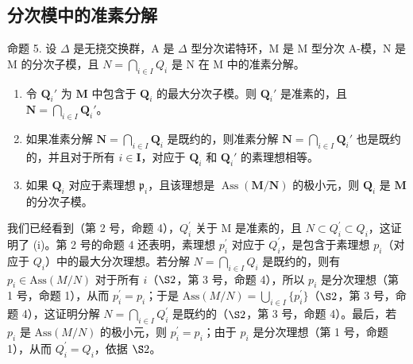\subsection{分次模中的准素分解}

命题 5. 设 \(\Delta\) 是无挠交换群，A 是 \(\Delta\) 型分次诺特环，M 是 M 型分次 A-模，N 是 M 的分次子模，且 \(N = \bigcap_{i \in I} Q_i\) 是 N 在 M 中的准素分解。

\begin{enumerate}
\def\labelenumi{(\roman{enumi})}
\item
  令 \(\mathbf{Q}_i'\) 为 \(\mathbf{M}\) 中包含于 \(\mathbf{Q}_i\) 的最大分次子模。则 \(\mathbf{Q}_i'\) 是准素的，且 \(\mathbf{N} = \bigcap_{i \in I} \mathbf{Q}_i'\)。
\item
  如果准素分解 \(\mathbf{N} = \bigcap_{i\in I}\mathbf{Q}_i\) 是既约的，则准素分解 \(\mathbf{N} = \bigcap_{i\in I}\mathbf{Q}_i'\) 也是既约的，并且对于所有 \(i\in \mathbf{I}\)，对应于 \(\mathbf{Q}_i\) 和 \(\mathbf{Q}_i'\) 的素理想相等。
\item
  如果 \(\mathbf{Q}_i\) 对应于素理想 \(\mathfrak{p}_i\)，且该理想是 \(\operatorname{Ass}(\mathbf{M} / \mathbf{N})\) 的极小元，则 \(\mathbf{Q}_i\) 是 \(\mathbf{M}\) 的分次子模。
\end{enumerate}

  我们已经看到（第 2 号，命题 4），\(Q_{i}^{\prime}\) 关于 M 是准素的，且 \(N \subset Q_{i}^{\prime} \subset Q_{i}\)，这证明了 (i)。第 2 号的命题 4 还表明，素理想 \(p_{i}^{\prime}\) 对应于 \(Q_{i}^{\prime}\)，是包含于素理想 \(p_{i}\)（对应于 \(Q_{i}\)）中的最大分次理想。若分解 \(N = \bigcap_{i \in I} Q_{i}\) 是既约的，则有 \(p_{i} \in \text{Ass}(M/N)\) 对于所有 \(i\)（\(\S 2\)，第 3 号，命题 4），所以 \(p_{i}\) 是分次理想（第 1 号，命题 1），从而 \(p_{i}^{\prime} = p_{i}\)；于是 \(\text{Ass}(M/N) = \bigcup_{i \in I} \{p_{i}^{\prime}\}\)（\(\S 2\)，第 3 号，命题 4），这证明分解 \(N = \bigcap_{i \in I} Q_{i}^{\prime}\) 是既约的（\(\S 2\)，第 3 号，命题 4）。最后，若 \(p_{i}\) 是 \(\text{Ass}(M/N)\) 的极小元，则 \(p_{i}^{\prime} = p_{i}\)；由于 \(p_{i}\) 是分次理想（第 1 号，命题 1），从而 \(Q_{i}^{\prime} = Q_{i}\)，依据 \(\S 2\)。

\relax{}
